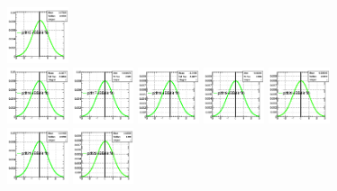 \begin{figure}[!htbp]
{{\includegraphics[width=0.16\textwidth]{fig/posteriors__pdf15_BB18_fitBBBE161718_ADDGRW.png}\\
\includegraphics[width=0.16\textwidth]{fig/posteriors__pdf16_BB18_fitBBBE161718_ADDGRW.png}
\includegraphics[width=0.16\textwidth]{fig/posteriors__pdf17_BB18_fitBBBE161718_ADDGRW.png}
\includegraphics[width=0.16\textwidth]{fig/posteriors__pdf18_BB18_fitBBBE161718_ADDGRW.png}
\includegraphics[width=0.16\textwidth]{fig/posteriors__pdf19_BB18_fitBBBE161718_ADDGRW.png}
\includegraphics[width=0.16\textwidth]{fig/posteriors__pdf20_BB18_fitBBBE161718_ADDGRW.png}\\
\includegraphics[width=0.16\textwidth]{fig/posteriors__pdf21_BB18_fitBBBE161718_ADDGRW.png}
\includegraphics[width=0.16\textwidth]{fig/posteriors__pdf22_BB18_fitBBBE161718_ADDGRW.png}
}}
\end{figure}
